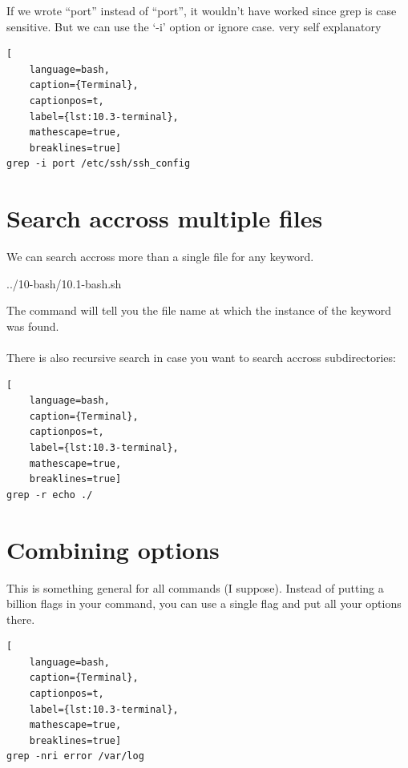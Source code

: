 If we wrote ``port'' instead of ``port'', it wouldn't have worked since grep is case sensitive. But we can
use the `-i' option or ignore case. very self explanatory

\begin{lstlisting}[
    language=bash, 
    caption={Terminal},
    captionpos=t,
    label={lst:10.3-terminal}, 
    mathescape=true, 
    breaklines=true]
grep -i port /etc/ssh/ssh_config
\end{lstlisting}

\pagebreak
\section{Search accross multiple files}

We can search accross more than a single file for any keyword.


{../10-bash/10.1-bash.sh}

The command will tell you the file name at which the instance of the keyword was found.\\ \\
There is also recursive search in case you want to search accross subdirectories:

\begin{lstlisting}[
    language=bash, 
    caption={Terminal},
    captionpos=t,
    label={lst:10.3-terminal}, 
    mathescape=true, 
    breaklines=true]
grep -r echo ./
\end{lstlisting}

\section{Combining options}

This is something general for all commands (I suppose). Instead of putting a billion flags in your command,
you can use a single flag and put all your options there.

\begin{lstlisting}[
    language=bash, 
    caption={Terminal},
    captionpos=t,
    label={lst:10.3-terminal}, 
    mathescape=true, 
    breaklines=true]
grep -nri error /var/log
\end{lstlisting}
